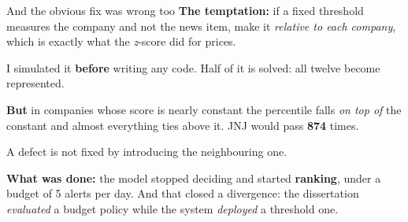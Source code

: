 \documentclass[aspectratio=169]{beamer}
\begin{document}
\begin{frame}{And the obvious fix was wrong too}
\textbf{The temptation:} if a fixed threshold measures the company and not the news item, make it
\emph{relative to each company}, which is exactly what the \emph{z}-score did for prices.
\vspace{3mm}

I simulated it \textbf{before} writing any code. Half of it is solved: all twelve become
represented.
\vspace{2mm}

\textbf{But} in companies whose score is nearly constant the percentile falls \emph{on top of} the
constant and almost everything ties above it. JNJ would pass \textbf{874} times.
\vspace{3mm}
\begin{center}
\large A defect is not fixed by introducing the neighbouring one.
\end{center}
\vspace{3mm}
\footnotesize
\textbf{What was done:} the model stopped deciding and started \textbf{ranking}, under a budget of
5 alerts per day. And that closed a divergence: the dissertation \emph{evaluated} a budget policy
while the system \emph{deployed} a threshold one.
\end{frame}
\end{document}
